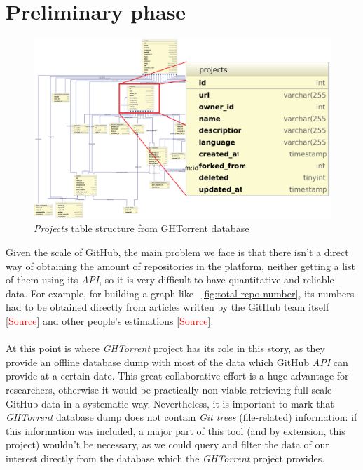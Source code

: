 \documentclass[a4paper, 12pt]{book}
\begin{document}
\section{Preliminary phase}
\label{sec:preliminary-phase}
\begin{figure}
  \centering
  \includegraphics[width=16cm, keepaspectratio]{img/ghtorrent-schema-detail}
  \caption{\textit{Projects} table structure from GHTorrent database}
  \label{fig:ghtorrent-schema-detail}
\end{figure}
Given the scale of GitHub, the main problem we face is that there isn't a direct way
of obtaining the amount of repositories in the platform, neither getting a list of them using its \textit{API}, so it is
very difficult to have quantitative and reliable data. For example, for building a graph like ~\ref{fig:total-repo-number},
its numbers had to be obtained directly from articles written by the GitHub team itself [\textcolor{red}{Source}]
and other people's estimations [\textcolor{red}{Source}].\\\\
At this point is where \emph{GHTorrent} project has its role in this story, as they provide an offline database dump with most
of the data which GitHub \textit{API} can provide at a certain date. This great collaborative effort is a huge advantage
for researchers, otherwise it would be practically non-viable retrieving full-scale GitHub data in a systematic way.
Nevertheless, it is important to mark that \emph{GHTorrent} database dump \underline{does not contain} \textit{Git trees}
(file-related) information: if this information was included, a major part of this tool (and by extension, this project) wouldn't
be necessary, as we could query and filter the data of our interest directly from the database which the \emph{GHTorrent} project provides.\\
\end{document}
